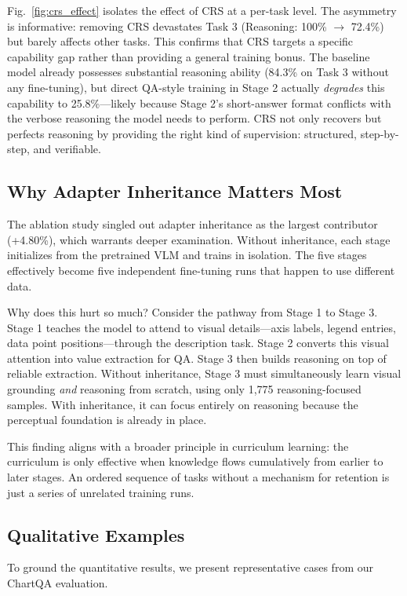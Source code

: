\documentclass[journal]{IEEEtran}
\newcommand{\crs}{CRS}
\begin{document}
Fig.~\ref{fig:crs_effect} isolates the effect of \crs{} at a per-task level. The asymmetry is informative: removing \crs{} devastates Task 3 (Reasoning: 100\% $\rightarrow$ 72.4\%) but barely affects other tasks. This confirms that \crs{} targets a specific capability gap rather than providing a general training bonus. The baseline model already possesses substantial reasoning ability (84.3\% on Task 3 without any fine-tuning), but direct QA-style training in Stage 2 actually \emph{degrades} this capability to 25.8\%---likely because Stage 2's short-answer format conflicts with the verbose reasoning the model needs to perform. \crs{} not only recovers but perfects reasoning by providing the right kind of supervision: structured, step-by-step, and verifiable.

\subsection{Why Adapter Inheritance Matters Most}
The ablation study singled out adapter inheritance as the largest contributor (+4.80\%), which warrants deeper examination. Without inheritance, each stage initializes from the pretrained VLM and trains in isolation. The five stages effectively become five independent fine-tuning runs that happen to use different data.

Why does this hurt so much? Consider the pathway from Stage 1 to Stage 3. Stage 1 teaches the model to attend to visual details---axis labels, legend entries, data point positions---through the description task. Stage 2 converts this visual attention into value extraction for QA. Stage 3 then builds reasoning on top of reliable extraction. Without inheritance, Stage 3 must simultaneously learn visual grounding \emph{and} reasoning from scratch, using only 1,775 reasoning-focused samples. With inheritance, it can focus entirely on reasoning because the perceptual foundation is already in place.

This finding aligns with a broader principle in curriculum learning: the curriculum is only effective when knowledge flows cumulatively from earlier to later stages. An ordered sequence of tasks without a mechanism for retention is just a series of unrelated training runs.

\subsection{Qualitative Examples}
To ground the quantitative results, we present representative cases from our ChartQA evaluation.
\end{document}
